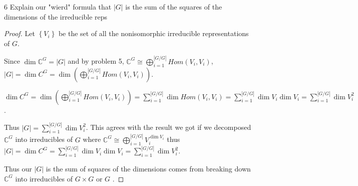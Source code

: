 \documentclass{article}
\newcommand{\C}{\mathbb{C}}
\begin{document}
\bigskip

\begin{PROB}{6}\label{Problem 6.}
    Explain our "wierd" formula that $|G|$ is the sum of the squares of the dimensions of the irreducible reps
\end{PROB}
\begin{proof}
    Let $\left\{ V_i \right\}$ be the set of all the nonisomorphic irreducible representations of $G$. 

    Since $\dim \C^G = |G|$ and by problem 5, $\C^G \cong \bigoplus_{i = 1}^{|G / G|} Hom(V_i, V_i)$, $|G| = \dim C^G = \dim\left(\bigoplus_{i = 1}^{|G / G|} Hom(V_i, V_i)\right)$.
    
    $\dim C^G = \dim\left(\bigoplus_{i = 1}^{|G / G|} Hom(V_i, V_i)\right) = \sum_{i = 1}^{|G / G|} \dim Hom(V_i , V_i) = \sum_{i = 1}^{|G / G|} \dim V_i \dim V_i = \sum_{i = 1}^{|G / G|} \dim V_i^2$.
    
    Thus $|G| = \sum_{i = 1}^{|G / G|} \dim V_i^2$. This agrees with the result we got if we decomposed $\C^G$ into irreducibles of $G$ where $\C^G \cong \bigoplus_{i = 1}^{|G / G|} V_i^{\dim V_i}$ thus $|G| = \dim C^G = \sum_{i = 1}^{|G / G|} \dim V_i \dim V_i = \sum_{i = 1}^{|G / G|} \dim V_i^2$.
    
    Thus our $|G|$ is the sum of squares of the dimensions comes from breaking down $\C^G$ into irreducibles of $G \times G$ or $G$ .     
\end{proof}
\end{document}
